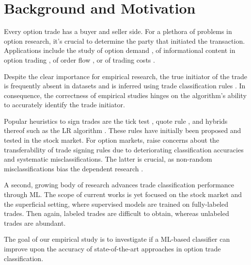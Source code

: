 

\section{Background and Motivation}

Every option trade has a buyer and seller side. For a plethora of problems in option research, it’s crucial to determine the party that initiated the transaction. Applications include the study of option demand \autocite[][]{garleanuDemandBasedOptionPricing2009}, of informational content in option trading \autocites[][]{huDoesOptionTrading2014}[][]{panInformationOptionVolume2006}[][]{caoInformationalContentOption2005}, of order flow \autocite[][]{muravyevOrderFlowExpected2016}, or of trading costs \autocite[][]{muravyevOptionsTradingCosts2020}. 

Despite the clear importance for empirical research, the true initiator of the trade is frequently absent in datasets and is inferred using trade classification rules \autocite[][]{easleyOptionVolumeStock1998}. In consequence, the correctness of empirical studies hinges on the algorithm's ability to accurately identify the trade initiator.

Popular heuristics to sign trades are the tick test \autocite[][]{hasbrouckTradesQuotesInventories1988}, quote rule \autocite[][]{harrisDayEndTransactionPrice1989}, and hybrids thereof such as the \gls{LR} algorithm \autocite[][]{leeInferringTradeDirection1991}. These rules have initially been proposed and tested in the stock market. For option markets, \textcites[][]{savickasInferringDirectionOption2003}[][]{grauerOptionTradeClassification2022} raise concerns about the transferability of trade signing rules due to deteriorating classification accuracies and systematic misclassifications. The latter is crucial, as non-random misclassifications bias the dependent research \autocites[][]{odders-whiteOccurrenceConsequencesInaccurate2000}[][]{theissenTestAccuracyLee2001}.

A second, growing body of research \autocites{blazejewskiLocalNonParametricModel2005}{rosenthalModelingTradeDirection2012}{ronenMachineLearningTrade2022} advances trade classification performance through \gls{ML}. The scope of current works is yet focused on the stock market and the superficial setting, where supervised models are trained on fully-labeled trades. Then again, labeled trades are difficult to obtain, whereas unlabeled trades are abundant.

The goal of our empirical study is to investigate if a \gls{ML}-based classifier can improve upon the accuracy of state-of-the-art approaches in option trade classification.

